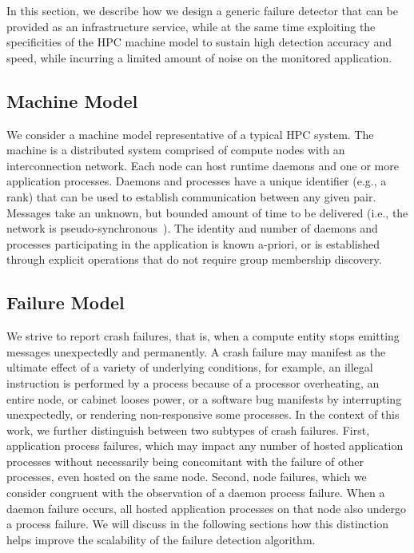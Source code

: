 \documentclass[sigconf]{acmart}
\begin{document}
In this section, we describe how we design a generic failure detector that can
be provided 
as an infrastructure service, while at the same time exploiting the 
specificities of the HPC machine model to sustain high detection accuracy 
and speed, while incurring a limited amount of noise on the monitored application. 

\subsection{Machine Model}

We consider a machine model representative of a typical HPC system. 
The machine is a distributed system comprised of compute nodes with an 
interconnection network. Each 
node can host runtime daemons and one or more application processes. Daemons 
and processes have a unique identifier (e.g., a rank) that can be used
to establish communication between any given pair. Messages take an unknown,
but bounded amount of time to be delivered (i.e., the network is pseudo-synchronous~\cite{Chandra96}).
 The identity and number of daemons and processes participating in the application is known a-priori, 
or is established through explicit operations that do not require group 
membership discovery. 

\subsection{Failure Model}

We strive to report crash failures, that is, when a compute entity stops emitting 
messages unexpectedly and permanently. A crash failure may manifest as
the ultimate effect of a variety of underlying conditions, for example, an illegal instruction 
is performed by a process because of a processor overheating, an entire 
node, or cabinet looses power, or a software bug manifests by interrupting 
unexpectedly, or rendering non-responsive some processes. In the context of 
this work, we further distinguish between two subtypes of crash failures.
First, application process failures, which may impact any number of 
hosted application processes without necessarily being concomitant
with the failure of other processes, even hosted on the same node.
Second, node failures, which we consider congruent with the observation of a daemon 
process failure. When a daemon failure occurs, all hosted application processes on
that node also undergo a process failure. We will discuss in the following 
sections how this distinction helps improve the scalability of the failure 
detection algorithm. 
\end{document}
